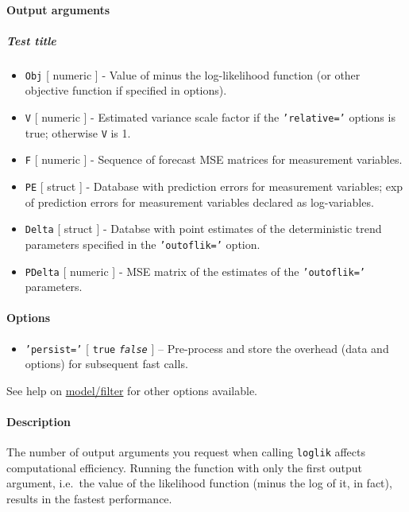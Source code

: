  \paragraph{Output arguments}
 
 \subparagraph{Test title}
 
 \begin{itemize}
 \item
   \texttt{Obj} {[} numeric {]} - Value of minus the log-likelihood
   function (or other objective function if specified in options).
 \item
   \texttt{V} {[} numeric {]} - Estimated variance scale factor if the
   \texttt{'relative='} options is true; otherwise \texttt{V} is 1.
 \item
   \texttt{F} {[} numeric {]} - Sequence of forecast MSE matrices for
   measurement variables.
 \item
   \texttt{PE} {[} struct {]} - Database with prediction errors for
   measurement variables; exp of prediction errors for measurement
   variables declared as log-variables.
 \item
   \texttt{Delta} {[} struct {]} - Databse with point estimates of the
   deterministic trend parameters specified in the \texttt{'outoflik='}
   option.
 \item
   \texttt{PDelta} {[} numeric {]} - MSE matrix of the estimates of the
   \texttt{'outoflik='} parameters.
 \end{itemize}
 
 \paragraph{Options}
 
 \begin{itemize}
 \item
   \texttt{'persist='} {[} \texttt{true} \textbar{} \emph{\texttt{false}}
   {]} -- Pre-process and store the overhead (data and options) for
   subsequent fast calls.
 \end{itemize}
 
 See help on \url{model/filter} for other options available.
 
 \paragraph{Description}
 
 The number of output arguments you request when calling \texttt{loglik}
 affects computational efficiency. Running the function with only the
 first output argument, i.e.~the value of the likelihood function (minus
 the log of it, in fact), results in the fastest performance.
 
